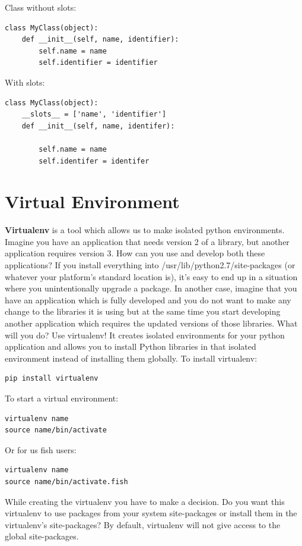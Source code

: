 \documentclass{report}
\begin{document}
    \bigbreak \noindent 
    Class without slots:
    \begin{verbatim}
class MyClass(object):
    def __init__(self, name, identifier):
        self.name = name
        self.identifier = identifier
    \end{verbatim}
    With slots:
\begin{verbatim}
class MyClass(object):
    __slots__ = ['name', 'identifier']
    def __init__(self, name, identifer):

        self.name = name
        self.identifer = identifer
\end{verbatim}
    \pagebreak \bigbreak \noindent \section{Virtual Environment}
    \bigbreak \noindent
    \textbf{Virtualenv} is a tool which allows us to make isolated python environments. Imagine you have an application that needs version 2 of a library, but another application requires version 3. How can you use and develop both these applications?
    \bigbreak \noindent 
    If you install everything into /usr/lib/python2.7/site-packages (or whatever your platform’s standard location is), it’s easy to end up in a situation where you unintentionally upgrade a package.
    \bigbreak \noindent 
    In another case, imagine that you have an application which is fully developed and you do not want to make any change to the libraries it is using but at the same time you start developing another application which requires the updated versions of those libraries.
    \bigbreak \noindent 
    What will you do? Use virtualenv! It creates isolated environments for your python application and allows you to install Python libraries in that isolated environment instead of installing them globally.
    \bigbreak \noindent 
    To install virtualenv:
\begin{verbatim}
pip install virtualenv
\end{verbatim}
    To start a virtual environment:
    \begin{verbatim}
virtualenv name
source name/bin/activate
    \end{verbatim}
    Or for us fish users:
    \begin{verbatim}
virtualenv name
source name/bin/activate.fish
    \end{verbatim}
    While creating the virtualenv you have to make a decision. Do you want this virtualenv to use packages from your system site-packages or install them in the virtualenv’s site-packages? By default, virtualenv will not give access to the global site-packages.
\end{document}

